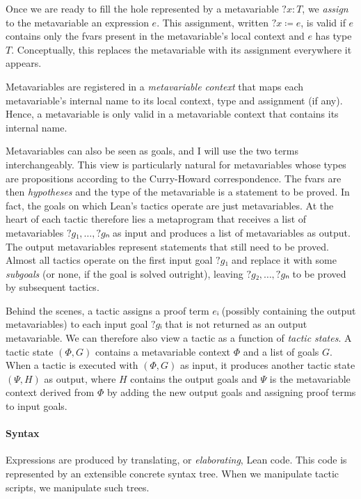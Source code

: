 \documentclass[sigplan,screen]{acmart}
\newcommand{\mvar}[1]{{?#1}}
\begin{document}
Once we are ready to fill the hole represented by a metavariable $\mvar{x} : T$, we \emph{assign} to the metavariable an expression $e$.
This assignment, written $\mvar{x} ≔ e$, is valid if $e$ contains only the fvars present in the metavariable's local context and $e$ has type $T$.
Conceptually, this replaces the metavariable with its assignment everywhere it appears.

Metavariables are registered in a \emph{metavariable context} that maps each metavariable's internal name to its local context, type and assignment (if any).
Hence, a metavariable is only valid in a metavariable context that contains its internal name.

Metavariables can also be seen as goals, and I will use the two terms interchangeably.
This view is particularly natural for metavariables whose types are propositions according to the Curry-Howard correspondence.
The fvars are then \emph{hypotheses} and the type of the metavariable is a statement to be proved.
In fact, the goals on which Lean's tactics operate are just metavariables.
At the heart of each tactic therefore lies a metaprogram that receives a list of metavariables $\mvar{g₁}, \dots, \mvar{gₙ}$ as input and produces a list of metavariables as output.
The output metavariables represent statements that still need to be proved.
Almost all tactics operate on the first input goal $\mvar{g₁}$ and replace it with some \emph{subgoals} (or none, if the goal is solved outright), leaving $\mvar{g₂}, \dots, \mvar{gₙ}$ to be proved by subsequent tactics.

Behind the scenes, a tactic assigns a proof term $eᵢ$ (possibly containing the output metavariables) to each input goal $\mvar{gᵢ}$ that is not returned as an output metavariable.
We can therefore also view a tactic as a function of \emph{tactic states}.
A tactic state $(Φ, G)$ contains a metavariable context $Φ$ and a list of goals $G$.
When a tactic is executed with $(Φ, G)$ as input, it produces another tactic state $(Ψ, H)$ as output, where $H$ contains the output goals and $Ψ$ is the metavariable context derived from $Φ$ by adding the new output goals and assigning proof terms to input goals.

\paragraph{Syntax}
Expressions are produced by translating, or \emph{elaborating}, Lean code.
This code is represented by an extensible concrete syntax tree.
When we manipulate tactic scripts, we manipulate such trees.
\end{document}

